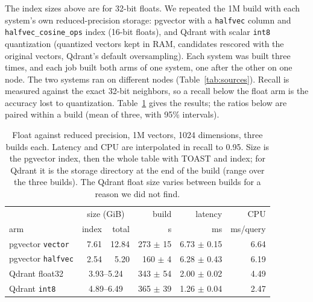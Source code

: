 \documentclass[preprint,12pt]{elsarticle}
\begin{document}
The index sizes above are for 32-bit floats. We repeated the 1M build with each system's own
reduced-precision storage: pgvector with a \texttt{halfvec} column and \texttt{halfvec\_cosine\_ops}
index (16-bit floats), and Qdrant with scalar \texttt{int8} quantization (quantized vectors kept in
RAM, candidates rescored with the original vectors, Qdrant's default oversampling). Each system
was built three times, and each job built both arms of one system, one after the other on one node.
The two systems ran on different nodes (Table~\ref{tab:sources}). Recall is measured against the exact
32-bit neighbors, so a recall below the float arm is the accuracy lost to quantization.
Table~\ref{tab:quant} gives the results; the ratios below are paired within a build
(mean of three, with 95\% intervals).

\begin{table}[t]
  \caption{Float against reduced precision, 1M vectors, 1024 dimensions, three builds each.
  Latency and CPU are interpolated in recall to 0.95. Size is the pgvector index, then the
  whole table with TOAST and index; for Qdrant it is the storage directory at the end of the
  build (range over the three builds). The Qdrant float size varies between builds for a
  reason we did not find.}
  \label{tab:quant}
  \small
  \begin{tabular}{@{}lrrrrr@{}}
    \toprule
    & \multicolumn{2}{c}{size (GiB)} & build & latency & CPU \\
    arm & index & total & s & ms & ms/query \\
    \midrule
    pgvector \texttt{vector} & 7.61 & 12.84 & 273 $\pm$ 15 & 6.73 $\pm$ 0.15 & 6.64 \\
    pgvector \texttt{halfvec} & 2.54 & 5.20 & 160 $\pm$ 4 & 6.28 $\pm$ 0.43 & 6.19 \\
    Qdrant float32 & \multicolumn{2}{c}{3.93--5.24} & 343 $\pm$ 54 & 2.00 $\pm$ 0.02 & 4.49 \\
    Qdrant \texttt{int8} & \multicolumn{2}{c}{4.89--6.49} & 365 $\pm$ 39 & 1.26 $\pm$ 0.04 & 2.47 \\
    \bottomrule
  \end{tabular}
\end{table}
\end{document}
